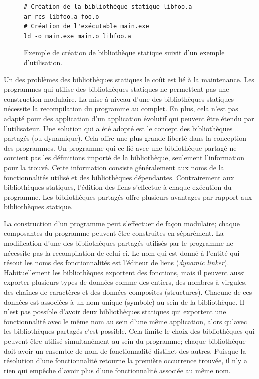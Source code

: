 \begin{figure}[ht]
    \begin{minipage}[t]{0.5\textwidth}
\begin{verbatim}
# Création de la bibliothèque statique libfoo.a
ar rcs libfoo.a foo.o
# Création de l'exécutable main.exe
ld -o main.exe main.o libfoo.a
\end{verbatim}
    \end{minipage}

    \caption{Exemple de création de bibliothèque statique suivit d'un exemple
    d'utilisation.}
\end{figure}

Un des problèmes des bibliothèques statiques le coût est lié à la maintenance.  Les
programmes qui utilise des bibliothèques statiques ne permettent pas une
construction modulaire. La mise à niveau d'une des bibliothèques statiques
nécessite la recompilation du programme au complet. En plus, cela n'est pas
adapté pour des application d'un application évolutif qui peuvent être étendu
par l'utilisateur. Une solution qui a été adopté est le
concept des bibliothèques partagés (ou dynamique). Cela offre une plus grande
liberté dans la conception des programmes. Un programme qui ce lié avec une
bibliothèque partagé ne contient pas les définitions importé de la
bibliothèque, seulement l'information pour la trouvé. Cette information
consiste généralement aux noms de la fonctionnalités utilisé et des
bibliothèques dépendantes. Contrairement aux bibliothèques statiques,
l'édition des liens s'effectue à chaque exécution du programme.
Les bibliothèques partagés offre plusieurs avantages par rapport
aux bibliothèques statique.

La construction d'un programme peut s'effectuer de façon modulaire; chaque
composantes du programme peuvent être construites en séparément.  La
modification d'une des bibliothèques partagés utilisés par
le programme ne nécessite pas la recompilation de celui-ci. Le nom qui est
donné à l'entité qui résout les noms des fonctionnalités est l'éditeur de liens (\textit{dynamic linker}).
Habituellement les bibliothèques exportent des fonctions, mais il peuvent aussi
exporter plusieurs types de données comme des entiers, des nombres à virgules,
des chaînes de caractères et des données composites (structures). Chacune de ces données est
associées à un nom unique (symbole) au sein de la bibliothèque.
Il n'est pas possible d'avoir deux bibliothèques statiques qui exportent une
fonctionnalité avec le même nom au sein d'une même application, alors qu'avec
les bibliothèques partagés c'est possible. Cela limite le choix des
bibliothèques qui peuvent être utilisé simultanément au sein du programme;
chaque bibliothèque doit avoir un ensemble de nom de fonctionnalité distinct
des autres. Puisque la résolution d'une fonctionnalité retourne la première
occurrence trouvée, il n'y a rien qui empêche d'avoir plus d'une fonctionnalité
associée au même nom.

